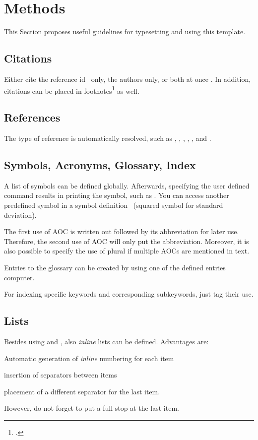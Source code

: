 \chapter{Methods}\label{sec:methods}
This Section proposes useful guidelines for typesetting and using this template.

\section{Citations}
Either cite the reference id~\parencite{RKHT17} only, the authors
\citeauthor{RKHT17} only, or both at once \eg \textcite[see][51\psq]{MGBCR04}.
In addition, citations can be placed in
footnotes\footcite[see][50\psqq]{MGBCR04} as well.

\section{References}
The type of reference is automatically resolved, such as ,
, , ,
, and .

\section{Symbols, Acronyms, Glossary, Index}
A list of symbols can be defined globally. Afterwards, specifying the user
defined command results in printing the symbol, such as \stddev. You can access
another predefined symbol in a symbol definition \eg\ \variance (squared symbol
for standard deviation).

The first use of \ac{AOC} is written out followed by its abbreviation for later
use. Therefore, the second use of \ac{AOC} will only put the abbreviation.
Moreover, it is also possible to specify the use of plural if multiple
\acp{AOC} are mentioned in text.

Entries to the glossary can be created by using one of the defined entries \eg
\gls{computer}.

For indexing specific keywords and
corresponding subkeywords, just tag their use.

\section{Lists}
Besides using  and , also \emph{inline} lists can
be defined. Advantages are:
\begin{enumerate*}[label=\upshape(\alph*),itemjoin={{; }},itemjoin*={{; and }}]
  \item Automatic generation of \emph{inline} numbering for each item
  \item insertion of separators between items
  \item placement of a different separator for the last item.
\end{enumerate*}
However, do not forget to put a full stop at the last item.

